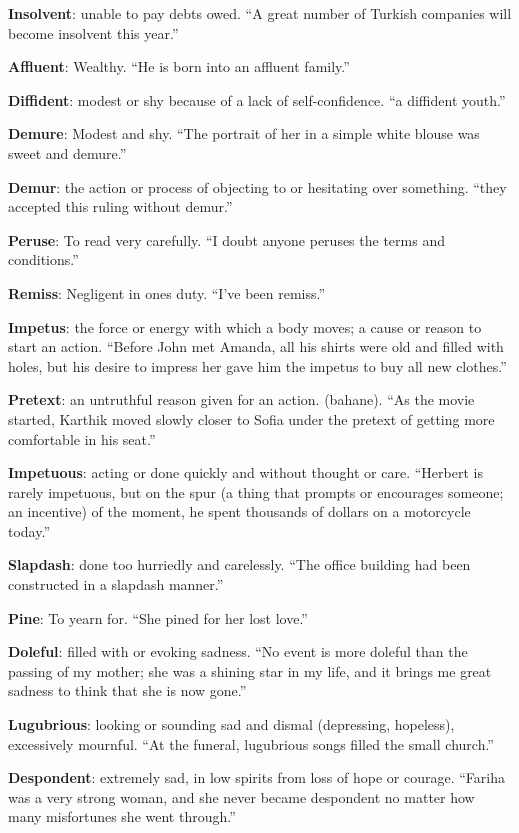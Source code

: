 \documentclass[12pt, a4paper]{ximera}
\begin{document}
\textbf{Insolvent}: unable to pay debts owed. ``A great number of Turkish companies will become insolvent this year.''

\textbf{Affluent}: Wealthy. ``He is born into an affluent family.''

\textbf{Diffident}: modest or shy because of a lack of self-confidence. ``a diffident youth.''

\textbf{Demure}: Modest and shy. ``The portrait of her in a simple white blouse was sweet and demure.''

\textbf{Demur}: the action or process of objecting to or hesitating over something. ``they accepted this ruling without demur.''

\textbf{Peruse}: To read very carefully. ``I doubt anyone peruses the terms and conditions.''

\textbf{Remiss}: Negligent in ones duty. ``I've been remiss.''

\textbf{Impetus}: the force or energy with which a body moves; a cause or reason to start an action. ``Before John met Amanda, all his shirts were old and filled with holes, but his desire to impress her gave him the impetus to buy all new clothes.''

\textbf{Pretext}: an untruthful reason given for an action. (bahane). ``As the movie started, Karthik moved slowly closer to Sofia under the pretext of getting more comfortable in his seat.''

\textbf{Impetuous}: acting or done quickly and without thought or care. ``Herbert is rarely impetuous, but on the spur (a thing that prompts or encourages someone; an incentive) of the moment, he spent thousands of dollars on a motorcycle today.''

\textbf{Slapdash}: done too hurriedly and carelessly. ``The office building had been constructed in a slapdash manner.''

\textbf{Pine}: To yearn for. ``She pined for her lost love.''

\textbf{Doleful}: filled with or evoking sadness. ``No event is more doleful than the passing of my mother; she was a shining star in my life, and it brings me great sadness to think that she is now gone.''

\textbf{Lugubrious}: looking or sounding sad and dismal (depressing, hopeless), excessively mournful. ``At the funeral, lugubrious songs filled the small church.''

\textbf{Despondent}: extremely sad, in low spirits from loss of hope or courage. ``Fariha was a very strong woman, and she never became despondent no matter how many misfortunes she went through.''
\end{document}
